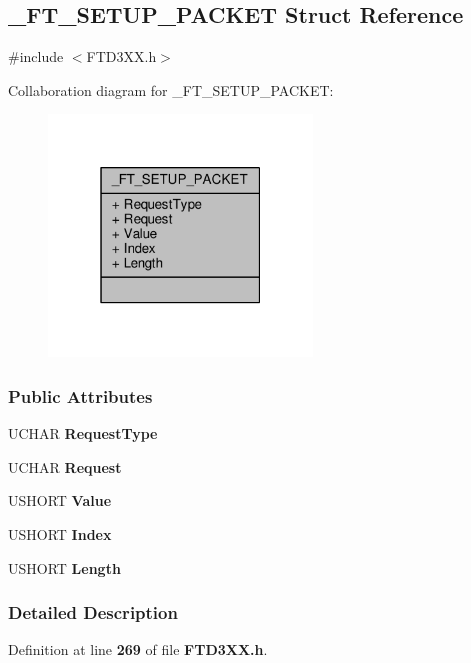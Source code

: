 \subsection{\+\_\+\+F\+T\+\_\+\+S\+E\+T\+U\+P\+\_\+\+P\+A\+C\+K\+ET Struct Reference}
\label{struct__FT__SETUP__PACKET}


{\ttfamily \#include $<$F\+T\+D3\+X\+X.\+h$>$}



Collaboration diagram for \+\_\+\+F\+T\+\_\+\+S\+E\+T\+U\+P\+\_\+\+P\+A\+C\+K\+ET\+:
\nopagebreak
\begin{figure}[H]
\begin{center}
\leavevmode
\includegraphics[width=199pt]{dc/d25/struct__FT__SETUP__PACKET__coll__graph}
\end{center}
\end{figure}
\subsubsection*{Public Attributes}
\begin{DoxyCompactItemize}
\item 
U\+C\+H\+AR {\bf Request\+Type}
\item 
U\+C\+H\+AR {\bf Request}
\item 
U\+S\+H\+O\+RT {\bf Value}
\item 
U\+S\+H\+O\+RT {\bf Index}
\item 
U\+S\+H\+O\+RT {\bf Length}
\end{DoxyCompactItemize}


\subsubsection{Detailed Description}


Definition at line {\bf 269} of file {\bf F\+T\+D3\+X\+X.\+h}.



